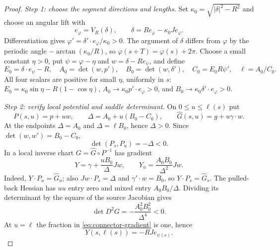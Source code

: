 \documentclass[11pt]{amsart}
\theoremstyle{definition}
\theoremstyle{remark}
\numberwithin{equation}{section}
\begin{document}
\begin{proof}
\emph{Step 1: choose the segment directions and lengths.}
Set $\kappa_0=\sqrt{|\delta|^2-R^2}$ and choose an angular lift with
\begin{equation}\label{eq:visibility-angle}
 e_\varphi=V_R(\delta),\qquad
 \delta=Re_\varphi-\kappa_0Je_\varphi.
\end{equation}
Differentiation gives $\varphi'=\delta'\cdot e_\varphi/\kappa_0>0$.
The argument of $\delta$ differs from $\varphi$ by the periodic angle
$-\arctan(\kappa_0/R)$, so $\varphi(s+T)=\varphi(s)+2\pi$.
Choose a small constant $\eta>0$, put $\psi=\varphi-\eta$ and
$w=\delta-Re_\psi$, and define
\begin{equation}\label{eq:connector-scalars}
 E_0=\delta\cdot e_\psi-R,\quad
 A_0=\det(w,p'),\quad B_0=\det(w,\delta'),\quad
 C_0=E_0R\psi',\quad \ell=A_0/C_0.
\end{equation}
All four scalars are positive for small $\eta$, uniformly in $s$:
$E_0=\kappa_0\sin\eta-R(1-\cos\eta)$,
$A_0\to\kappa_0p'\cdot e_\varphi>0$, and
$B_0\to\kappa_0\delta'\cdot e_\varphi>0$.

\emph{Step 2: verify local potential and saddle determinant.}
On $0\le u\le\ell(s)$ put
\begin{equation}\label{eq:connector-map}
 P(s,u)=p+uw,\qquad \Delta=A_0+u(B_0-C_0),\qquad
 \widehat G(s,u)=g+u\gamma\cdot w.
\end{equation}
At the endpoints $\Delta=A_0$ and $\Delta=\ell B_0$, hence $\Delta>0$.
Since $\det(w,w')=B_0-C_0$,
\begin{equation}\label{eq:connector-jacobian}
 \det(P_s,P_u)=-\Delta<0.
\end{equation}
In a local inverse chart $G=\widehat G\circ P^{-1}$ has gradient
\begin{equation}\label{eq:connector-gradient}
 Y=\gamma+\frac{uB_0}{\Delta}Jw,
 \qquad Y_u=\frac{A_0B_0}{\Delta^2}Jw.
\end{equation}
Indeed, $Y\cdot P_u=\widehat G_u$; also $Jw\cdot P_s=\Delta$ and
$\gamma'\cdot w=B_0$, so $Y\cdot P_s=\widehat G_s$.
The pulled-back Hessian has $uu$ entry zero and mixed entry
$A_0B_0/\Delta$. Dividing its determinant by the square of the source
Jacobian gives
\begin{equation}\label{eq:connector-det}
 \det D^2G=-\frac{A_0^2B_0^2}{\Delta^4}<0.
\end{equation}
At $u=\ell$ the fraction in \eqref{eq:connector-gradient} is one, hence
\begin{equation}\label{eq:connector-terminal}
 Y(s,\ell(s))=-RJ e_{\psi(s)}.
\end{equation}


\end{proof}
\end{document}
